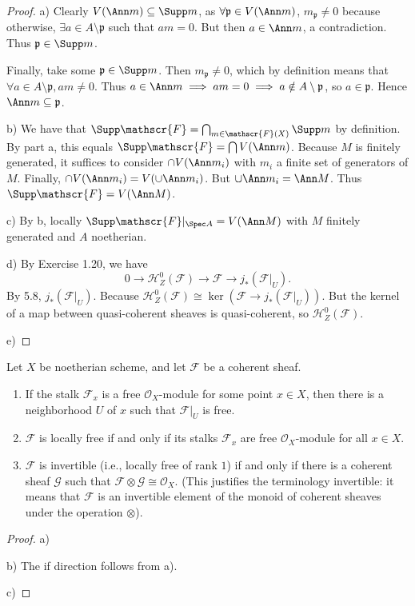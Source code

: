 \begin{proof}
	a) 
	Clearly $V(\Ann m) \subseteq \Supp m$, as $\forall \mathfrak{p} \in V(\Ann m) $, $m_{\mathfrak{p}} \ne 0 $ because otherwise, $\exists a \in A\setminus \mathfrak{p} $ such that $am = 0 $.
	But then $a \in \Ann m $, a contradiction.
	Thus $\mathfrak{p} \in \Supp m $.

	Finally, take some $\mathfrak{p} \in \Supp m $.
	Then $m_{\mathfrak{p}} \ne 0 $, which by definition means that $\forall a \in A\setminus \mathfrak{p}, am \ne 0 $.
	Thus $a \in \Ann m \implies am = 0 \implies a \notin A \setminus \mathfrak{p} $, so $a \in \mathfrak{p} $.
	Hence $\Ann m \subseteq \mathfrak{p} $.

	b) We have that $\Supp \mathscr{F} = \bigcap_{m \in \mathscr{F}(X)} \Supp m $ by definition.
	By part a, this equals $\Supp \mathscr{F} = \bigcap V(\Ann m) $.
	Because $M $ is finitely generated, it suffices to consider $\cap V(\Ann m_i) $ with $m_i $ a finite set of generators of $M $.
	Finally, $\cap V(\Ann m_i) = V(\cup \Ann m_i) $.
	But $\cup \Ann m_i = \Ann M $.
	Thus $\Supp \mathscr{F} = V(\Ann M) $.

	c) By b, locally $\Supp \mathscr{F}|_{\Spec A} = V(\Ann M)$ with $M $ finitely generated and $A $ noetherian.

	d) By Exercise 1.20, we have
	\[
		0 \to \mathscr{H}_Z^0(\mathscr{F}) \to \mathscr{F} \to j_\ast(\mathscr{F}|_U)
	.\] 
	By 5.8, $j_\ast(\mathscr{F}|_U) $.
	Because $\mathscr{H}_{Z}^0(\mathscr{F}) \cong \ker(\mathscr{F}\to j_\ast(\mathscr{F}|_U)) $.
	But the kernel of a map between quasi-coherent sheaves is quasi-coherent, so $\mathscr{H}_Z^0(\mathscr{F}) $.

	e) 
\end{proof}

\begin{exercise}%
	Let $X $ be noetherian scheme, and let $\mathscr{F} $ be a coherent sheaf.
	\begin{enumerate}
		\item If the stalk $\mathscr{F}_x $ is a free $\mathscr{O}_X $-module for some point $x\in X $, then there is a neighborhood $U $ of $x $ such that $\mathscr{F}|_U $ is free.
		\item $\mathscr{F} $ is locally free if and only if its stalks $\mathscr{F}_x $ are free $\mathscr{O}_X $-module for all $x \in X $.
		\item $\mathscr{F} $ is invertible (i.e., locally free of rank $1 $) if and only if there is a coherent sheaf $\mathscr{G} $ such that $\mathscr{F} \otimes \mathscr{G} \cong \mathscr{O}_X $. (This justifies the terminology invertible: it means that $\mathscr{F} $ is an invertible element of the monoid of coherent sheaves under the operation $\otimes $).
	\end{enumerate}
\end{exercise}
\begin{proof}
	a) 

	b) The if direction follows from a).

	c)
\end{proof}

